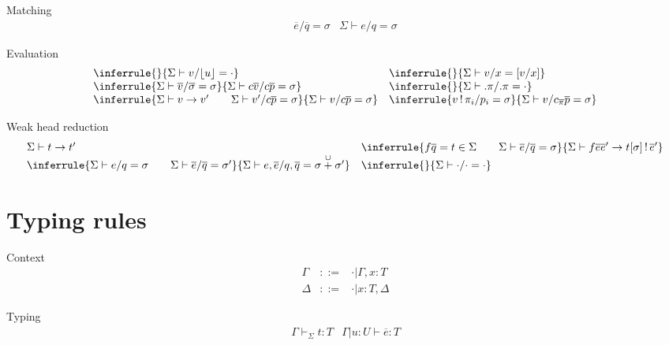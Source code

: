 \documentclass[acmlarge]{acmart}\settopmatter{}
\renewcommand{\|}{|}
\begin{document}
Matching
\[
\begin{array}{ll}
\overline{e}/\overline{q} = \sigma  & 
\Sigma \vdash e/q = \sigma
\end{array}
\]

Evaluation
\[
\begin{array}{ll}
\inferrule{}
{\Sigma \vdash v/\lfloor u \rfloor = \cdot} %
& 
\inferrule{}
{\Sigma \vdash v/x = [v/x]} %
\\
\inferrule{\Sigma \vdash \overline{v}/\overline{\sigma} = \sigma}
{\Sigma \vdash c\overline{v}/c\overline{p} = \sigma}  %
&
\inferrule{}
{\Sigma \vdash .\pi/.\pi = \cdot} %
\\
\inferrule{\Sigma \vdash v \to v' \qquad \Sigma \vdash v'/c\overline{p} = \sigma} 
{\Sigma \vdash v / c \overline{p} = \sigma} %
& 
\inferrule{v \bang \pi_i / p_i = \sigma}
{\Sigma \vdash v / c_{\overline \pi} \overline{p} = \sigma} %
\end{array}
\]

Weak head reduction
\[
\begin{array}{ll}
\Sigma \vdash t \to t' &
\inferrule{f \overline q = t \in \Sigma \qquad \Sigma \vdash \overline{e}/\overline{q} = \sigma}
{\Sigma \vdash f \overline{e} \overline{e}' \to t[\sigma] \bang \overline{e}'}
\\
\inferrule{\Sigma \vdash e/q = \sigma \qquad \Sigma \vdash \overline{e}/\overline{q} = \sigma'}
{\Sigma \vdash e, \overline{e}/q, \overline{q} = \sigma \overset{\cup}{+} \sigma'}%
&
\inferrule{}
{\Sigma \vdash \cdot/\cdot = \cdot} %
\end{array}
\]


\section{Typing rules}
\label{sec:typing}

Context 
\[
\begin{array}{lcl}
\Gamma & ::= & \cdot \| \Gamma, x:T \\
\Delta & ::= & \cdot \| x:T, \Delta
\end{array}
\]

Typing 
\[
\begin{array}{ll}
\Gamma \vdash_\Sigma t : T & \Gamma \| u: U \vdash \overline{e} : T
\end{array}
\]
\end{document}
